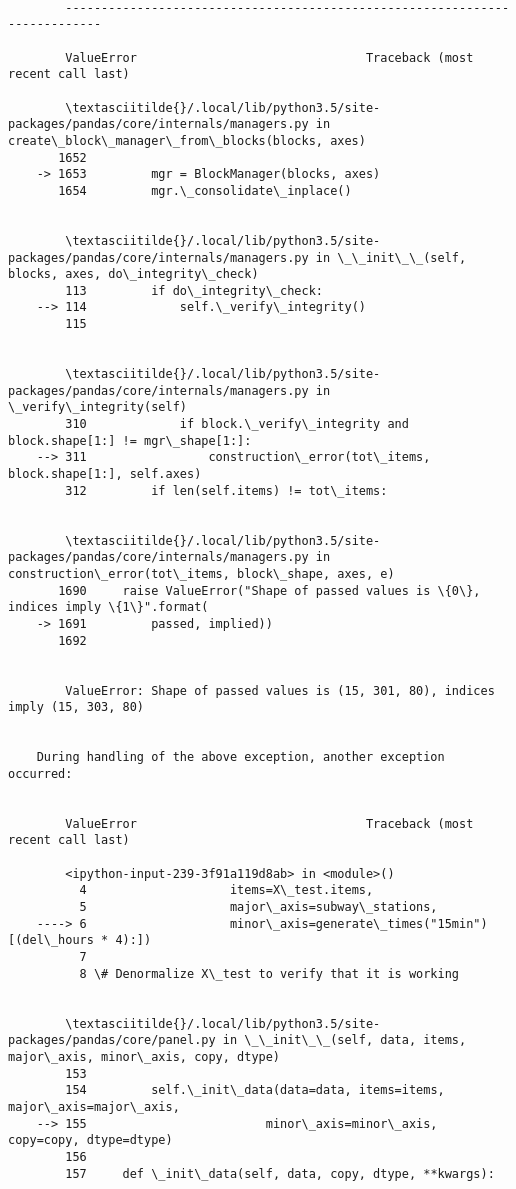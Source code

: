 \documentclass[11pt]{article}
\begin{document}
    \begin{Verbatim}[commandchars=\\\{\}]

        ---------------------------------------------------------------------------

        ValueError                                Traceback (most recent call last)

        \textasciitilde{}/.local/lib/python3.5/site-packages/pandas/core/internals/managers.py in create\_block\_manager\_from\_blocks(blocks, axes)
       1652 
    -> 1653         mgr = BlockManager(blocks, axes)
       1654         mgr.\_consolidate\_inplace()


        \textasciitilde{}/.local/lib/python3.5/site-packages/pandas/core/internals/managers.py in \_\_init\_\_(self, blocks, axes, do\_integrity\_check)
        113         if do\_integrity\_check:
    --> 114             self.\_verify\_integrity()
        115 


        \textasciitilde{}/.local/lib/python3.5/site-packages/pandas/core/internals/managers.py in \_verify\_integrity(self)
        310             if block.\_verify\_integrity and block.shape[1:] != mgr\_shape[1:]:
    --> 311                 construction\_error(tot\_items, block.shape[1:], self.axes)
        312         if len(self.items) != tot\_items:


        \textasciitilde{}/.local/lib/python3.5/site-packages/pandas/core/internals/managers.py in construction\_error(tot\_items, block\_shape, axes, e)
       1690     raise ValueError("Shape of passed values is \{0\}, indices imply \{1\}".format(
    -> 1691         passed, implied))
       1692 


        ValueError: Shape of passed values is (15, 301, 80), indices imply (15, 303, 80)

        
    During handling of the above exception, another exception occurred:


        ValueError                                Traceback (most recent call last)

        <ipython-input-239-3f91a119d8ab> in <module>()
          4                    items=X\_test.items,
          5                    major\_axis=subway\_stations,
    ----> 6                    minor\_axis=generate\_times("15min")[(del\_hours * 4):])
          7 
          8 \# Denormalize X\_test to verify that it is working


        \textasciitilde{}/.local/lib/python3.5/site-packages/pandas/core/panel.py in \_\_init\_\_(self, data, items, major\_axis, minor\_axis, copy, dtype)
        153 
        154         self.\_init\_data(data=data, items=items, major\_axis=major\_axis,
    --> 155                         minor\_axis=minor\_axis, copy=copy, dtype=dtype)
        156 
        157     def \_init\_data(self, data, copy, dtype, **kwargs):



\end{Verbatim}
\end{document}

